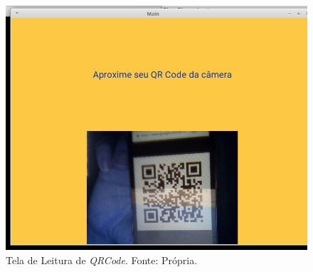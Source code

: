         \begin{figure}[H]
            \centering
            \includegraphics[scale= 0.4]{figuras/leitor-qrcode.png}
            \caption{Tela de Leitura de \textit{QRCode}. Fonte: Própria.}
            \label{leitor-qrcode}
        \end{figure}
